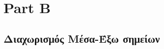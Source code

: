 \documentclass{report}
\begin{document}
\chapter{Part B}

\section{Διαχωρισμός Μέσα-Έξω σημείων}

\clearpage
{}
\end{document}

